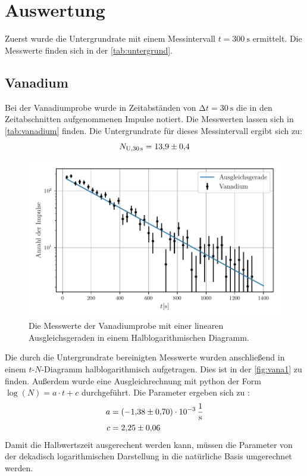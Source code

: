\section{Auswertung}
\label{sec:Auswertung}
Zuerst wurde die Untergrundrate mit einem Messintervall $t=\SI{300}{\second}$ ermittelt. 
Die Messwerte finden sich in der \autoref{tab:untergrund}.
\subsection{Vanadium}
Bei der Vanadiumprobe wurde in Zeitabständen von $\increment t = \SI{30}{\second}$ die in den Zeitabschnitten aufgenommenen Impulse notiert. 
Die Messwerten lassen sich in \autoref{tab:vanadium} finden.
Die Untergrundrate für  dieses Messintervall ergibt sich zu:
\begin{equation*}
  N_{\text{U}, \SI{30}{\second}} = \num{13.9 \pm 0.4}
\end{equation*}
\begin{figure}
  \centering
  \includegraphics{build/vanadium.pdf}
  \caption{Die Messwerte der Vanadiumprobe mit einer linearen Ausgleichsgeraden in einem Halblogarithmischen Diagramm.}
  \label{fig:vana1}
\end{figure}
Die durch die Untergrundrate bereinigten Messwerte wurden anschließend in einem $t$-$N$-Diagramm halblogarithmisch aufgetragen.
Dies ist in der \autoref{fig:vana1} zu finden. 
Außerdem wurde eine Ausgleichrechnung mit python der Form $\log(N) = a\cdot t + c$ durchgeführt.
Die Parameter ergeben sich zu :
\begin{align*}
  a &= \SI{-1.38(70)e-3}{\per\second}\\
  c &= \num{2.25\pm 0.06}
\end{align*}
Damit die Halbwertszeit ausgerechent werden kann, müssen die Parameter von der dekadisch logarithmischen Darstellung in die natürliche Basis umgerechnet werden.
